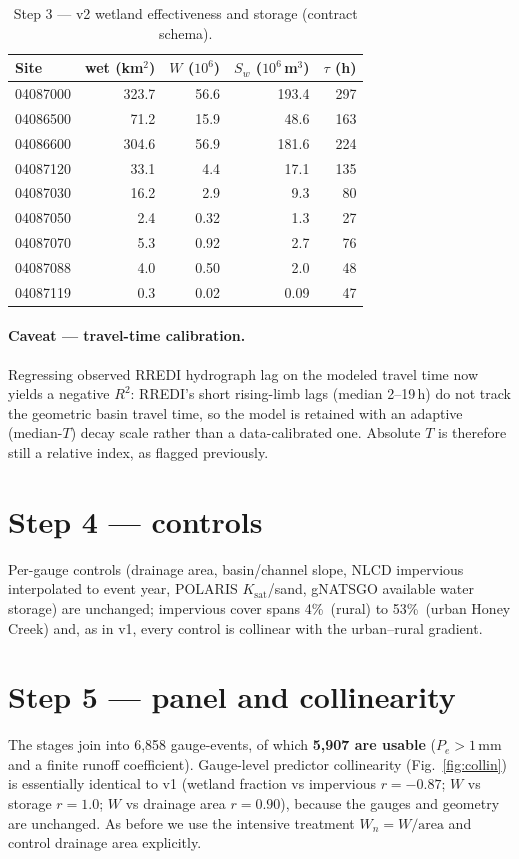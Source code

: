 \documentclass[11pt]{article}
\begin{document}
\begin{table}[htbp]\centering
\caption{Step 3 --- v2 wetland effectiveness and storage (contract schema).}
\label{tab:s3}\small
\begin{tabular}{lrrrr}
\toprule
Site & wet (km$^2$) & $W$ ($10^6$) & $S_w$ ($10^6$\,m$^3$) & $\tau$ (h) \\
\midrule
04087000 & 323.7 & 56.6 & 193.4 & 297 \\
04086500 & 71.2  & 15.9 & 48.6  & 163 \\
04086600 & 304.6 & 56.9 & 181.6 & 224 \\
04087120 & 33.1  & 4.4  & 17.1  & 135 \\
04087030 & 16.2  & 2.9  & 9.3   & 80  \\
04087050 & 2.4   & 0.32 & 1.3   & 27  \\
04087070 & 5.3   & 0.92 & 2.7   & 76  \\
04087088 & 4.0   & 0.50 & 2.0   & 48  \\
04087119 & 0.3   & 0.02 & 0.09  & 47  \\
\bottomrule
\end{tabular}
\end{table}

\paragraph{Caveat --- travel-time calibration.} Regressing observed RREDI hydrograph lag on the
modeled travel time now yields a negative $R^2$: RREDI's short rising-limb lags (median 2--19\,h)
do not track the geometric basin travel time, so the model is retained with an adaptive
(median-$T$) decay scale rather than a data-calibrated one. Absolute $T$ is therefore still a
relative index, as flagged previously.

\section{Step 4 --- controls}
Per-gauge controls (drainage area, basin/channel slope, NLCD impervious interpolated to event
year, POLARIS $K_{\text{sat}}$/sand, gNATSGO available water storage) are unchanged; impervious
cover spans 4\%\ (rural) to 53\%\ (urban Honey Creek) and, as in v1, every control is collinear
with the urban--rural gradient.

\section{Step 5 --- panel and collinearity}
The stages join into 6{,}858 gauge-events, of which \textbf{5{,}907 are usable} ($P_e>1$\,mm and a
finite runoff coefficient). Gauge-level predictor collinearity (Fig.~\ref{fig:collin}) is
essentially identical to v1 (wetland fraction vs impervious $r=-0.87$; $W$ vs storage $r=1.0$; $W$
vs drainage area $r=0.90$), because the gauges and geometry are unchanged. As before we use the
intensive treatment $W_n=W/\text{area}$ and control drainage area explicitly.
\end{document}

